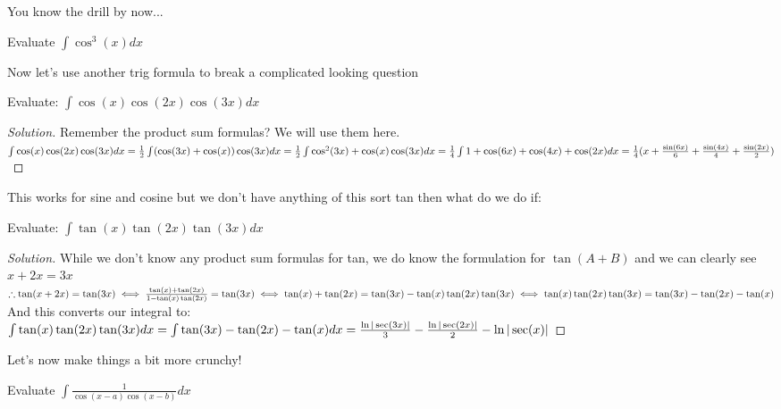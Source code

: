 You know the drill by now...\\
\begin{example}
    Evaluate $\int \cos^3(x) dx$
\end{example}
Now let's use another trig formula to break a complicated looking question\\
\begin{example}
    Evaluate: $\int \cos(x)\cos(2x)\cos(3x)dx$
\end{example}
\begin{proof}
    [Solution]
    Remember the product sum formulas? We will use them here.\\
    $\int \cos(x)\cos(2x)\cos(3x)dx\\
    = \frac{1}{2}\int (\cos(3x)+\cos(x))\cos(3x)dx\\
    = \frac{1}{2} \int \cos^2(3x)+\cos(x)\cos(3x)dx\\
    = \frac{1}{4} \int 1+\cos(6x)+\cos(4x)+\cos(2x) dx\\
    = \frac{1}{4}(x+\frac{\sin(6x)}{6}+\frac{\sin(4x)}{4}+\frac{\sin(2x)}{2})$
\end{proof}
This works for sine and cosine but we don't have anything of this sort tan then what do we do if:\\
\begin{example}
    Evaluate: $\int \tan(x) \tan(2x) \tan(3x) dx$
\end{example}
\begin{proof}
    [Solution]
    While we don't know any product sum formulas for tan, we do know the formulation for $\tan(A+B)$ and we can clearly see $x+2x=3x$\\
    $\therefore \tan(x+2x)=\tan(3x)\\
    \iff \frac{\tan(x)+\tan(2x)}{1-\tan(x)\tan(2x)}=\tan(3x)\\
    \iff \tan(x)+\tan(2x)=\tan(3x)-\tan(x) \tan(2x) \tan(3x)\\
    \iff \tan(x) \tan(2x) \tan(3x)= \tan(3x)-\tan(2x)-\tan(x)$\\
    And this converts our integral to:\\
    $\int \tan(x) \tan(2x) \tan(3x) dx\\
    = \int \tan(3x)-\tan(2x)-\tan(x) dx\\
    = \frac{\ln{|\sec(3x)|}}{3}-\frac{\ln{|\sec(2x)|}}{2}-\ln{|\sec(x)|}$
\end{proof}
Let's now make things a bit more crunchy!\\
\begin{example}
    Evaluate $\int \frac{1}{\cos(x-a)\cos(x-b)} dx$
\end{example}
